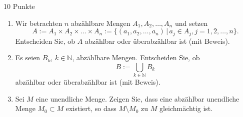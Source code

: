 \documentclass{../problemset}
\author{Michael van Straten}
\begin{document}
\maketitle


\begin{problem}{10 Punkte}
\begin{enumerate}
	\item Wir betrachten $n$ abzählbare Mengen $A_1, A_2, \ldots, A_n$ und setzen
	      \[ A := A_1 \times A_2 \times \ldots \times A_n := \{(a_1, a_2, \ldots, a_n) \,|\, a_j \in A_j, j = 1, 2, \ldots, n\}. \]
	      Entscheiden Sie, ob $A$ abzählbar oder überabzählbar ist (mit Beweis).
	\item Es seien $B_k$, $k \in \mathbb{N}$, abzählbare Mengen. Entscheiden Sie, ob
	      \[ B := \bigcup_{k \in \mathbb{N}} B_k \]
	      abzählbar oder überabzählbar ist (mit Beweis).
	\item Sei $M$ eine unendliche Menge. Zeigen Sie, dass eine abzählbar unendliche Menge $M_0 \subset M$ existiert, so dass $M \setminus M_0$ zu $M$ gleichmächtig ist.
\end{enumerate}
\end{problem}
\end{document}
